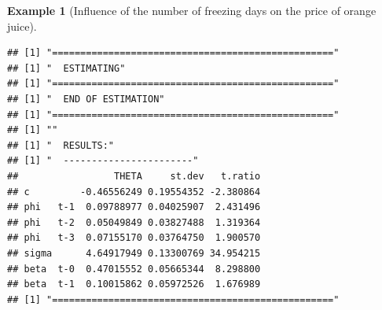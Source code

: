 \documentclass[
  12pt,
]{book}
\newenvironment{Shaded}{\begin{snugshade}}{\end{snugshade}}
\newcommand{\AttributeTok}[1]{\textcolor[rgb]{0.77,0.63,0.00}{#1}}
\newcommand{\ConstantTok}[1]{\textcolor[rgb]{0.00,0.00,0.00}{#1}}
\newcommand{\ControlFlowTok}[1]{\textcolor[rgb]{0.13,0.29,0.53}{\textbf{#1}}}
\newcommand{\DecValTok}[1]{\textcolor[rgb]{0.00,0.00,0.81}{#1}}
\newcommand{\FunctionTok}[1]{\textcolor[rgb]{0.00,0.00,0.00}{#1}}
\newcommand{\NormalTok}[1]{#1}
\newcommand{\OtherTok}[1]{\textcolor[rgb]{0.56,0.35,0.01}{#1}}
\newcommand{\SpecialCharTok}[1]{\textcolor[rgb]{0.00,0.00,0.00}{#1}}
\newcommand{\StringTok}[1]{\textcolor[rgb]{0.31,0.60,0.02}{#1}}
\theoremstyle{definition}
\theoremstyle{definition}
\newtheorem{example}{Example}[chapter]
\theoremstyle{definition}
\theoremstyle{definition}
\theoremstyle{remark}
\begin{document}
\begin{example}[Influence of the number of freezing days on the price of orange juice]
\begin{Shaded}
\end{Shaded}

\begin{verbatim}
## [1] "=================================================="
## [1] "  ESTIMATING"
## [1] "=================================================="
## [1] "  END OF ESTIMATION"
## [1] "=================================================="
## [1] ""
## [1] "  RESULTS:"
## [1] "  -----------------------"
##                 THETA     st.dev   t.ratio
## c         -0.46556249 0.19554352 -2.380864
## phi   t-1  0.09788977 0.04025907  2.431496
## phi   t-2  0.05049849 0.03827488  1.319364
## phi   t-3  0.07155170 0.03764750  1.900570
## sigma      4.64917949 0.13300769 34.954215
## beta  t-0  0.47015552 0.05665344  8.298800
## beta  t-1  0.10015862 0.05972526  1.676989
## [1] "=================================================="
\end{verbatim}


\end{example}
\end{document}
